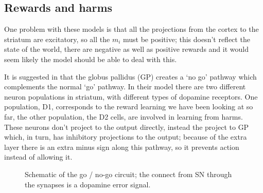 \documentclass[11pt,a4paper]{scrartcl}
\begin{document}
\subsection*{Rewards and harms}
One problem with these models is that all the projections from the
cortex to the striatum are excitatory, so all the $m_i$ must be
positive; this doesn't reflect the state of the world, there are
negative as well as positive rewards and it would seem likely the
model should be able to deal with this.

It is suggested in \cite{FrankEtAl2004a} that the globus pallidus (GP)
creates a \lq{}no go\rq{} pathway which complements the normal
\lq{}go\rq{} pathway. In their model there are two different neuron
populations in striatum, with different types of dopamine
receptors. One population, D1, corresponds to the reward learning we
have been looking at so far, the other population, the D2 cells, are
involved in learning from harms. These neurons don't project to the
output directly, instead the project to GP which, in turn, has
inhibitory projections to the output; because of the extra layer there
is an extra minus sign along this pathway, so it prevents action
instead of allowing it.

\begin{figure}
\begin{center}
\end{center}
\caption{Schematic of the go / no-go circuit; the connect from SN through the synapses is a dopamine error signal.\label{fig:gng}}
\end{figure}
\end{document}
